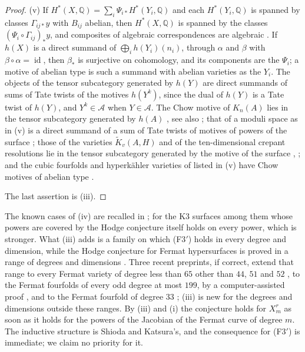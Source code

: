 \documentclass[11pt,reqno]{amsart}
\theoremstyle{plain}
\theoremstyle{definition}
\theoremstyle{remark}
\newcommand{\QQ}{\mathbb{Q}}
\DeclareMathOperator{\id}{id}
\begin{document}
\begin{proof}
(v) If $H^{*}(X,\QQ)=\sum_{i}\Psi_{i*}H^{*}(Y_{i},\QQ)$ and each
$H^{*}(Y_{i},\QQ)$ is spanned by classes $\Gamma_{ij*}y$ with $B_{ij}$
abelian, then $H^{*}(X,\QQ)$ is spanned by the classes
$(\Psi_{i}\circ\Gamma_{ij})_{*}y$, and composites of algebraic
correspondences are algebraic \cite[Chapter~16]{Ful98}. If $h(X)$ is a
direct summand of $\bigoplus_{i}h(Y_{i})(n_{i})$, through $\alpha$ and
$\beta$ with $\beta\circ\alpha=\id$, then $\beta_{*}$ is surjective on
cohomology, and its components are the $\Psi_{i}$; a motive of abelian type
is such a summand with abelian varieties as the $Y_{i}$. The objects of the
tensor subcategory generated by $h(Y)$ are direct summands of sums of Tate
twists of the motives $h(Y^{k})$, since the dual of $h(Y)$ is a Tate twist of
$h(Y)$, and $Y^{k}\in\mathcal{A}$ when $Y\in\mathcal{A}$. The Chow motive of
$K_{n}(A)$ lies in the tensor subcategory generated by $h(A)$
\cite[Theorem~2.7, Corollary~2.8]{Xu15}, see also \cite[Theorem~1.5]{FTV19};
that of a moduli space as in (v) is a direct summand of a sum of Tate twists
of motives of powers of the surface \cite[Theorem~0.1]{Bue20}; those of the
varieties $\widetilde K_{v}(A,H)$ and of the ten-dimensional crepant
resolutions lie in the tensor subcategory generated by the motive of the
surface \cite[Theorem~1.1]{Flo23}, \cite[Corollary~4.5]{FFZ21}; and the cubic
fourfolds and hyperk\"ahler varieties of \cite{ABLP26} listed in (v) have
Chow motives of abelian type \cite[Theorem~3.5 and its proof,
Proposition~3.9, Theorem~4.2]{ABLP26}.

The last assertion is (iii).
\end{proof}

The known cases of (iv) are recalled in ; for the K3
surfaces among them whose powers are covered by \cite{Var22} the Hodge
conjecture itself holds on every power, which is stronger. What (iii) adds is
a family on which \textup{(F3$'$)} holds in every degree and dimension, while
the Hodge conjecture for Fermat hypersurfaces is proved in a range of degrees
and dimensions \cite{Shi79b}. Three recent preprints, if
correct, extend that range to every Fermat variety of degree less than $65$
other than $44$, $51$ and $52$ \cite{MMMV26}, to the Fermat fourfolds of
every odd degree at most $199$, by a computer-assisted proof \cite{Jum26},
and to the Fermat fourfold of degree $33$ \cite{FK26}; (iii) is new for the
degrees and dimensions outside these ranges. By (iii) and
(i) the conjecture holds for $X^{r}_{m}$ as soon as it
holds for the powers of the Jacobian of the Fermat curve of degree $m$. The
inductive structure is Shioda and Katsura's, and the consequence for
\textup{(F3$'$)} is immediate; we claim no priority for it.
\end{document}
